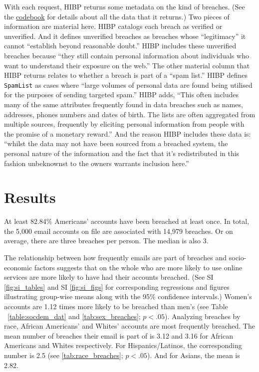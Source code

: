 \documentclass[12pt, letterpaper]{article}
\begin{document}
With each request, HIBP returns some metadata on the kind of breaches. (See the \href{https://github.com/themains/pwned/blob/master/data/hibp\_codebook.xlsx}{codebook} for details about all the data that it returns.) Two pieces of information are material here. HIBP catalogs each breach as verified or unverified. And it defines unverified breaches as breaches whose ``legitimacy'' it cannot ``establish beyond reasonable doubt.'' HIBP includes these unverified breaches because ``they still contain personal information about individuals who want to understand their exposure on the web.'' The other material column that HIBP returns relates to whether a breach is part of a ``spam list.'' HIBP defines \texttt{SpamList} as cases where ``large volumes of personal data are found being utilised for the purposes of sending targeted spam.'' HIBP adds, ``This often includes many of the same attributes frequently found in data breaches such as names, addresses, phones numbers and dates of birth. The lists are often aggregated from multiple sources, frequently by eliciting personal information from people with the promise of a monetary reward.'' And the reason HIBP includes these data is: ``whilst the data may not have been sourced from a breached system, the personal nature of the information and the fact that it's redistributed in this fashion unbeknownst to the owners warrants inclusion here.''

\section*{Results}
At least 82.84\% Americans' accounts have been breached at least once. In total, the 5,000 email accounts on file are associated with 14,979 breaches. Or on average, there are three breaches per person. The median is also 3.

The relationship between how frequently emails are part of breaches and socio-economic factors suggests that on the whole who are more likely to use online services are more likely to have had their accounts breached. (See SI \ref{fig:si_tables} and SI \ref{fig:si_figs} for corresponding regressions and figures illustrating group-wise means along with the 95\% confidence intervals.) Women's accounts are 1.12 times more likely to be breached than men's (see Table ~\ref{table:socdem_dat} and \ref{tab:sex_breaches}; $p < .05$). Analyzing breaches by race, African Americans' and Whites' accounts are most frequently breached. The mean number of breaches their email is part of is 3.12 and 3.16 for African Americans and Whites respectively. For Hispanics/Latinos, the corresponding number is 2.5 (see \ref{tab:race_breaches}; $p < .05$). And for Asians, the mean is 2.82. 
\end{document}
